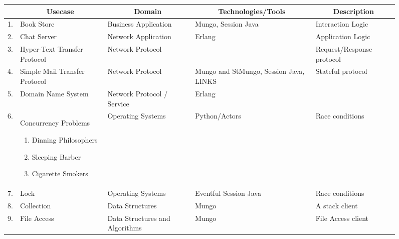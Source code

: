 \begin{figure}
	\begin{longtable}{|  l | p{3.2cm} | p{3cm} | p{2.5cm} | p{2.7cm} | }
		\hline
			&	\multicolumn{1}{c|}{Usecase}
							&	\multicolumn{1}{c|}{Domain}
														&	\multicolumn{1}{c|}{Technologies/Tools}
																					&	\multicolumn{1}{c|}{Description}
		\\
		\hline
		1.	&	Book Store	&	Business Application	&	Mungo, Session Java		&	Interaction Logic
		\\

		\hline
		2.	&	Chat Server	&	Network Application		&	Erlang					&	Application Logic
		\\

		\hline
		3.	&	Hyper-Text Transfer Protocol
							&	Network Protocol		&							&	Request/Response protocol
		\\

		\hline
		4.	&	Simple Mail Transfer Protocol
							&	Network Protocol		&	Mungo and StMungo, Session Java, LINKS
																					&	Stateful protocol
		\\
		\hline
		5.	&	Domain Name System
							&	Network Protocol / Service		&	Erlang
																					&	
		\\
		\hline
		6.	&	Concurrency	Problems
				\begin{enumerate}[label=$\bullet$]
					\item	Dinning Philosophers
					\item	Sleeping Barber
					\item	Cigarette Smokers
				\end{enumerate}
							&	Operating Systems		&	Python/Actors			&	Race conditions
		\\
		\hline
		7.	&	Lock		&	Operating Systems		&	Eventful Session Java	&	Race conditions
		\\

		\hline
		8.	&	Collection	&	Data Structures			&	Mungo					&	A stack client
		\\

		\hline
		9.	&	File Access	&	Data Structures and Algorithms
														&	Mungo					&	File Access client
		\\


\end{longtable}
\end{figure}
